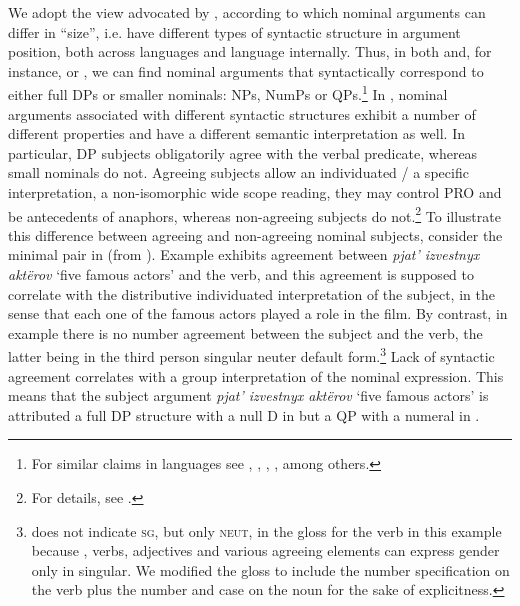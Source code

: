 \documentclass[output=paper
,modfonts
,nonflat]{langsci/langscibook}
\begin{document}
	We adopt the view advocated by \citet{Pereltsvaig2006}, according to which nominal arguments can differ in ``size'', i.e. have different types of syntactic structure in argument position, both across languages and language internally. Thus, in both  and, for instance,  or , we can find nominal arguments that syntactically correspond to either full DPs or smaller nominals: NPs, NumPs or QPs.\footnote{For similar claims in  languages see  \citet{Schmitt1999, Schmitt2003}, \citet{MunnSchmitt2005}, \citet{Dobrovie-Sorin2006}, \citet{Cyrino2015}, among others.} In , nominal arguments associated with different syntactic structures exhibit a number of different properties and have a different semantic interpretation as well. In particular, DP subjects obligatorily agree with the verbal predicate, whereas small nominals do not. Agreeing subjects allow an individuated / a specific interpretation, a non-isomorphic wide scope reading, they may control PRO and be antecedents of anaphors, whereas non-agreeing subjects do not.\footnote{For details, see \citet[447]{Pereltsvaig2006}.} To illustrate this difference between agreeing and non-agreeing nominal subjects, consider the minimal pair in  (from \citealt[438--9, ex. 3]{Pereltsvaig2006}). Example  exhibits  agreement between \textit{pjat' izvestnyx akt\"erov} `five famous actors' and the verb, and this agreement is supposed to correlate with the distributive individuated interpretation of the subject, in the sense that each one of the famous actors played a role in the film. By contrast, in example  there is no number agreement between the subject and the verb, the latter being in the third person singular neuter default form.\footnote{\citet{Pereltsvaig2006} does not indicate \textsc{sg}, but only \textsc{neut}, in the gloss for the verb in this example because , verbs, adjectives and various agreeing elements can express gender only in singular. We modified the gloss to include the number specification on the verb plus the number and case on the noun for the sake of explicitness.} Lack of syntactic agreement correlates with a group interpretation of the nominal expression. This means that the subject argument \textit{pjat' izvestnyx akt\"erov} `five famous actors' is attributed a full DP structure with a null D in  but a QP with a numeral in .
	
\end{document}
